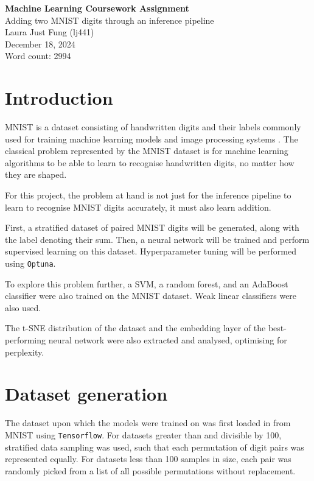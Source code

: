\documentclass[11pt,a4paper]{article}
\begin{document}
 

\begin{center}
    \LARGE{\textbf{Machine Learning Coursework Assignment}}
    \\
    \Large{{Adding two MNIST digits through an inference pipeline}}
    \\
    \large{Laura Just Fung (lj441)}
    \\
    December 18, 2024
    \\
    Word count: 2994
\end{center}

\section{Introduction}

MNIST is a dataset consisting of handwritten digits and their labels commonly used for training machine learning models and image processing systems \citep{deng2012mnist}. The classical problem represented by the MNIST dataset is for machine learning algorithms to be able to learn to recognise handwritten digits, no matter how they are shaped.

For this project, the problem at hand is not just for the inference pipeline to learn to recognise MNIST digits accurately, it must also learn addition.

First, a stratified dataset of paired MNIST digits will be generated, along with the label denoting their sum. Then, a neural network will be trained and perform supervised learning on this dataset. Hyperparameter tuning will be performed using \texttt{Optuna}.

To explore this problem further, a SVM, a random forest, and an AdaBoost classifier were also trained on the MNIST dataset. Weak linear classifiers were also used.

The t-SNE distribution of the dataset and the embedding layer of the best-performing neural network were also extracted and analysed, optimising for perplexity.

\section{Dataset generation}
The dataset upon which the models were trained on was first loaded in from MNIST using \texttt{Tensorflow}. For datasets greater than and divisible by 100, stratified data sampling was used, such that each permutation of digit pairs was represented equally. For datasets less than 100 samples in size, each pair was randomly picked from a list of all possible permutations without replacement.
\end{document}
